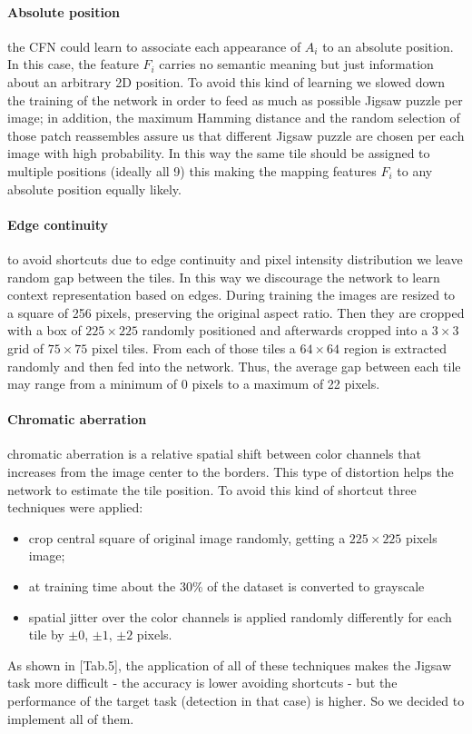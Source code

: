\paragraph{Absolute position}
the CFN could learn to associate each appearance of $A_i$ to an absolute position. In this case, the feature $F_i$ carries no semantic meaning but just information about an arbitrary 2D position. To avoid this kind of learning we slowed down the training of the network in order to feed as much as possible Jigsaw puzzle per image; in addition, the maximum Hamming distance and the random selection of those patch reassembles assure us that different Jigsaw puzzle are chosen per each image with high probability. In this way the same tile should be assigned to multiple positions (ideally all 9) this making the mapping features $F_i$ to any absolute position equally likely.

\paragraph{Edge continuity}\label{p:edge_continuity}
to avoid shortcuts due to edge continuity and pixel intensity distribution we leave random gap between the tiles. In this way we discourage the network to learn context representation based on edges. During training the images are resized to a square of 256 pixels, preserving the original aspect ratio. Then they are cropped with a box of $225 \times 225$ randomly positioned and afterwards cropped into a $3 \times 3$ grid of $75 \times 75$ pixel tiles. From each of those tiles a $64 \times 64$ region is extracted randomly and then fed into the network. Thus, the average gap between each tile may range from a minimum of 0 pixels to a maximum of 22 pixels.

\paragraph{Chromatic aberration}\label{p:chromatic_aberration}
chromatic aberration is a relative spatial shift between color channels that increases from the image center to the borders. This type of distortion helps the network to estimate the tile position. To avoid this kind of shortcut three techniques were applied:
\begin{itemize}
    \item crop central square of original image randomly, getting a $225 \times 225$ pixels image;
    \item at training time about the 30\% of the dataset is converted to grayscale
    \item spatial jitter over the color channels is applied randomly differently for each tile by $\pm0$, $\pm1$, $\pm2$ pixels. 
\end{itemize}
As shown in \cite{Noroozi_2016}[Tab.5], the application of all of these techniques makes the Jigsaw task more difficult - the accuracy is lower avoiding shortcuts - but the performance of the target task (detection in that case) is higher. So we decided to implement all of them.

